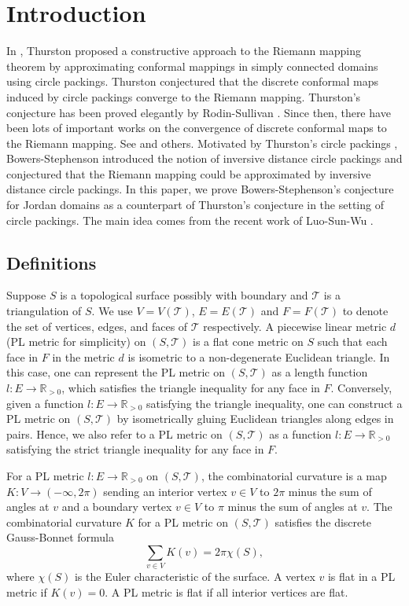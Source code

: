 \documentclass[12pt]{amsart}
\begin{document}
\section{Introduction}
In \cite{Th2}, Thurston proposed a constructive approach to the Riemann mapping theorem by approximating conformal mappings in simply connected domains using circle packings. Thurston conjectured that the discrete conformal maps induced by circle packings converge to the Riemann mapping. Thurston's conjecture has been proved elegantly by Rodin-Sullivan \cite{RS}.
Since then, there have been lots of important works on the convergence of discrete conformal maps to the Riemann mapping. See \cite{Bucking, GLW, HS1, HS2, LSW,WZ} and others.
Motivated by Thurston's circle packings \cite{Th}, Bowers-Stephenson \cite{BS} introduced the notion of
inversive distance circle packings and conjectured that the Riemann mapping
could be approximated by inversive distance circle packings.
In this paper, we prove Bowers-Stephenson's conjecture for Jordan domains as a counterpart of Thurston's conjecture \cite{Th2} in the setting of
circle packings.
The main idea comes from the recent work of Luo-Sun-Wu \cite{LSW}.

\subsection{Definitions}
Suppose $S$ is a topological surface possibly with boundary and $\mathcal{T}$
is a triangulation of $S$.
We use $V = V(\mathcal{T})$, $E = E(\mathcal{T})$ and $F = F(\mathcal{T})$ to
denote the set of vertices, edges, and faces of $\mathcal{T}$ respectively.
A piecewise linear metric $d$ (PL metric for simplicity) on $(S, \mathcal{T})$
is a flat cone metric on $S$ such that each face in $F$ in the metric $d$ is isometric to a non-degenerate Euclidean triangle.
In this case, one can represent the PL metric on $(S, \mathcal{T})$ as a length function $l: E\rightarrow \mathbb{R}_{>0}$,
which satisfies the triangle inequality for any face in $F$.
Conversely, given a function $l: E\rightarrow \mathbb{R}_{>0}$ satisfying
the triangle inequality, one can construct a PL metric on $(S, \mathcal{T})$
by isometrically gluing Euclidean triangles along edges in pairs. Hence, we also refer to a PL metric on $(S, \mathcal{T})$
as a function $l: E\rightarrow \mathbb{R}_{>0}$ satisfying the strict triangle inequality for any face in $F$.

For a PL metric $l: E\rightarrow \mathbb{R}_{>0}$ on $(S, \mathcal{T})$, the combinatorial curvature is a map $K: V\rightarrow (-\infty, 2\pi)$
sending an interior vertex $v\in V$ to $2\pi$ minus the sum of angles at $v$ and
a boundary vertex $v\in V$ to $\pi$ minus the sum of angles at $v$.
The combinatorial curvature $K$ for a PL metric on $(S, \mathcal{T})$ satisfies the discrete Gauss-Bonnet formula
\begin{equation}\label{discrete Gauss-Bonnet formula}
  \sum_{v\in V}K(v)=2\pi\chi(S),
\end{equation}
where $\chi(S)$ is the Euler characteristic of the surface. A vertex $v$ is flat in a PL metric if $K(v) = 0$. A PL metric is flat if all interior vertices are flat.
\end{document}
